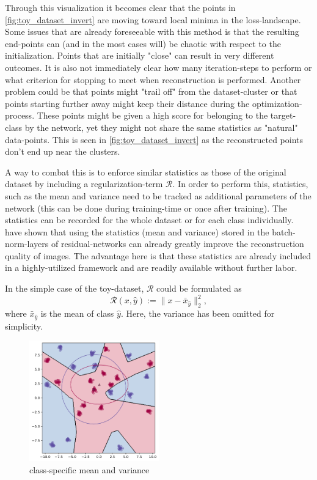 Through this visualization it becomes clear that the points in \ref{fig:toy_dataset_invert} are moving toward local minima in the loss-landscape.
Some issues that are already foreseeable with this method is that the resulting end-points can (and in the most cases will) be chaotic with respect to the initialization. Points that are initially "close" can result in very different outcomes. It is also not immediately clear how many iteration-steps to perform or what criterion for stopping to meet when reconstruction is performed.
Another problem could be that points might "trail off" from the dataset-cluster or that points starting further away might keep their distance during the optimization-process. These points might be given a high score for belonging to the target-class by the network, yet they might not share the same statistics as "natural" data-points. This is seen in \ref{fig:toy_dataset_invert} as the reconstructed points don't end up near the clusters.

A way to combat this is to enforce similar statistics as those of the original dataset by including a regularization-term $\mathcal R$. In order to perform this, statistics, such as the mean and variance need to be tracked as additional parameters of the network (this can be done during training-time or once after training).
The statistics can be recorded for the whole dataset or for each class individually.
\cite{DeepInversion} have shown that using the statistics (mean and variance) stored in the batch-norm-layers of residual-networks can already greatly improve the reconstruction quality of images.
The advantage here is that these statistics are already included in a highly-utilized framework and are readily available without further labor. 

In the simple case of the toy-dataset, $\mathcal R$ could be formulated as
$$\mathcal R(x,\hat y) := \|x-\bar x_{\hat y}\|_2^2
\comma$$
where $\bar x_{\hat y}$ is the mean of class $\hat y$. Here, the variance has been omitted for simplicity.

\begin{figure}
\centering
\includegraphics[width=0.5\textwidth]{Figures/toy_dataset_stats.png}
\decoRule
\caption{class-specific mean and variance}
\label{fig:toy_dataset_stats}
\end{figure}

